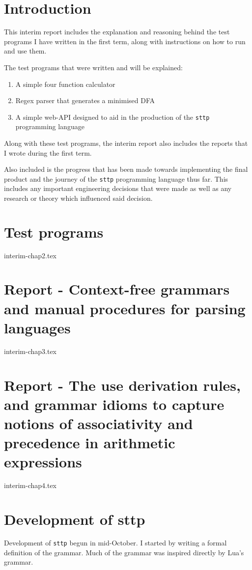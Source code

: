 \documentclass[]{interim}
\theoremstyle{definition}
\begin{document}
\chapter{Introduction}

This interim report includes the explanation and reasoning behind the test programs I have written in the first term, along with instructions on how to run and use them.

\begin{center}
    The test programs that were written and will be explained:
    \vspace{-1em}
    \begin{enumerate}
        \item A simple four function calculator
        \item Regex parser that generates a minimised DFA
        \item A simple web-API designed to aid in the production of the \verb|sttp| programming language
    \end{enumerate}
\end{center}

Along with these test programs, the interim report also includes the reports that I wrote during the first term.

Also included is the progress that has been made towards implementing the final product and the journey of the \verb|sttp| programming language thus far. This includes any important engineering decisions that were made as well as any research or theory which influenced said decision.

\chapter{Test programs}

{interim-chap2.tex}

\chapter{Report - Context-free grammars and manual procedures for parsing languages}

{interim-chap3.tex}

\chapter{Report - The use derivation rules, and grammar idioms to capture notions of associativity and precedence in arithmetic expressions}

{interim-chap4.tex}

\chapter{Development of sttp}

Development of \verb|sttp| begun in mid-October. I started by writing a formal definition of the grammar. Much of the grammar was inspired directly by Lua's grammar\textsuperscript{\cite{ierusalimschy_henrique-de-figueiredo_celes_2020}}.

\newpage
\label{endpage}
\printbibliography
\end{document}
